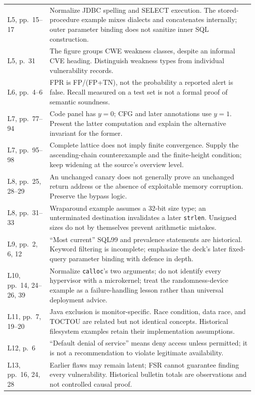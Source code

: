 \documentclass[11pt,a4paper]{article}
\numberwithin{figure}{section}
\begin{document}
\begin{longtable}{@{}>{\raggedright\arraybackslash}p{26mm}>{\raggedright\arraybackslash}p{123mm}@{}}
L5, pp.~15--17 & Normalize JDBC spelling and SELECT execution. The stored-procedure example mixes dialects and concatenates internally; outer parameter binding does not sanitize inner SQL construction.\\
L5, p.~31 & The figure groups CWE weakness classes, despite an informal CVE heading. Distinguish weakness types from individual vulnerability records.\\
L6, pp.~4--6 & FPR is FP/(FP+TN), not the probability a reported alert is false. Recall measured on a test set is not a formal proof of semantic soundness.\\
L7, pp.~77--94 & Code panel has $y=0$; CFG and later annotations use $y=1$. Present the latter computation and explain the alternative invariant for the former.\\
L7, pp.~95--98 & Complete lattice does not imply finite convergence. Supply the ascending-chain counterexample and the finite-height condition; keep widening at the source's overview level.\\
L8, pp.~25, 28--29 & An unchanged canary does not generally prove an unchanged return address or the absence of exploitable memory corruption. Preserve the bypass logic.\\
L8, pp.~31--33 & Wraparound example assumes a 32-bit size type; an unterminated destination invalidates a later \texttt{strlen}. Unsigned sizes do not by themselves prevent arithmetic mistakes.\\
L9, pp.~2, 6, 12 & ``Most current'' SQL99 and prevalence statements are historical. Keyword filtering is incomplete; emphasize the deck's later fixed-query parameter binding with defence in depth.\\
L10, pp.~14, 24--26, 39 & Normalize \texttt{calloc}'s two arguments; do not identify every hypervisor with a microkernel; treat the randomness-device example as a failure-handling lesson rather than universal deployment advice.\\
L11, pp.~7, 19--20 & Java exclusion is monitor-specific. Race condition, data race, and TOCTOU are related but not identical concepts. Historical filesystem examples retain their implementation assumptions.\\
L12, p.~6 & ``Default denial of service'' means deny access unless permitted; it is not a recommendation to violate legitimate availability.\\
L13, pp.~16, 24, 28 & Earlier flaws may remain latent; FSR cannot guarantee finding every vulnerability. Historical bulletin totals are observations and not controlled causal proof.\\

\end{longtable}
\end{document}
